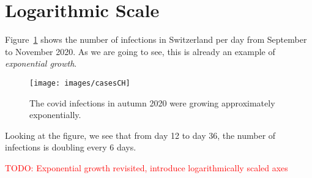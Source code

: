 \section*{Logarithmic Scale}
Figure~\ref{fig:casesCH} shows the number of infections in Switzerland per day from September to November 2020.
As we are going to see, this is already an example of \textit{exponential growth}.
\begin{figure}[ht]
	\centering
	\texttt{[image: images/casesCH]}
	\caption{The covid infections in autumn 2020 were growing approximately exponentially.}
	\label{fig:casesCH}
\end{figure}
Looking at the figure, we see that from day 12 to day 36, the number of infections is doubling every 6 days.

\textcolor{red}{TODO: Exponential growth revisited, introduce logarithmically scaled axes}